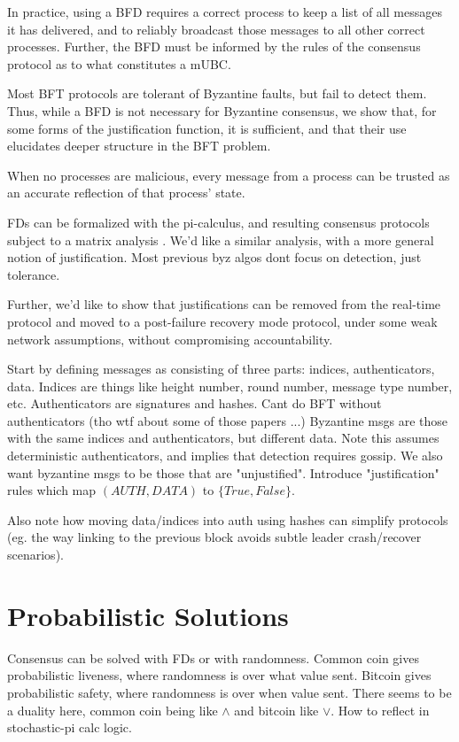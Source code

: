 In practice, using a BFD requires a correct process to keep a list of all messages it has delivered,
and to reliably broadcast those messages to all other correct processes.
Further, the BFD must be informed by the rules of the consensus protocol as to what constitutes a mUBC.

Most BFT protocols are tolerant of Byzantine faults, but fail to detect them.
Thus, while a BFD is not necessary for Byzantine consensus, we show that, for some 
forms of the justification function, it is sufficient,
and that their use elucidates deeper structure in the BFT problem.






When no processes are malicious,
every message from a process can be trusted as an accurate reflection of that process' state.



FDs can be formalized with the pi-calculus, 
and resulting consensus protocols subject to a matrix analysis \cite{nestmann2003modeling}.
We'd like a similar analysis, with a more general notion of justification.
Most previous byz algos dont focus on detection, just tolerance.

Further, we'd like to show that justifications can be removed from the real-time
protocol and moved to a post-failure recovery mode protocol, under some weak network assumptions,
without compromising accountability.

Start by defining messages as consisting of three parts: indices, authenticators, data.
Indices are things like height number, round number, message type number, etc.
Authenticators are signatures and hashes.
Cant do BFT without authenticators (tho wtf about some of those papers ...)
Byzantine msgs are those with the same indices and authenticators, but different data.
Note this assumes deterministic authenticators, and implies that detection requires gossip.
We also want byzantine msgs to be those that are "unjustified".
Introduce "justification" rules which map $(AUTH, DATA)$ to $\{True, False\}$.

Also note how moving data/indices into auth using hashes can simplify protocols
(eg. the way linking to the previous block avoids subtle leader crash/recover scenarios).

\section{Probabilistic Solutions}
Consensus can be solved with FDs or with randomness.
Common coin gives probabilistic liveness, where randomness is over what value sent.
Bitcoin gives probabilistic safety, where randomness is over when value sent.
There seems to be a duality here, common coin being like $\wedge$ and bitcoin like $\vee$.
How to reflect in stochastic-pi calc logic.

